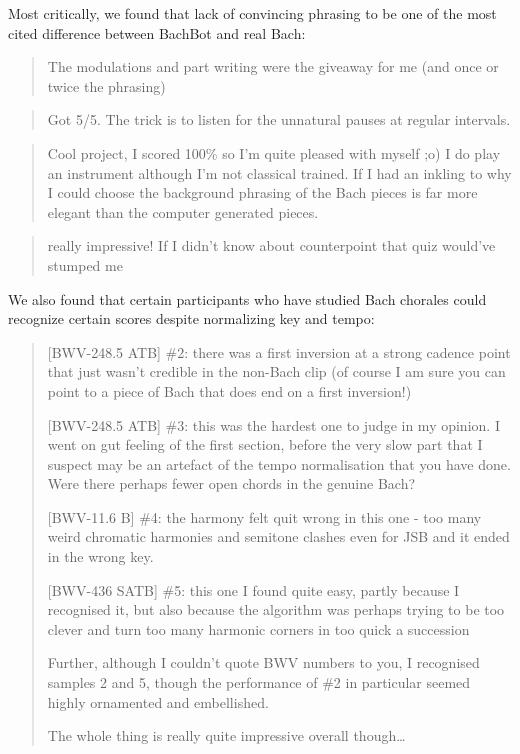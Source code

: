 Most critically, we found that lack of convincing phrasing to be one of the most
cited difference between BachBot and real Bach:
\begin{quote}
  The modulations and part writing were the giveaway for me (and once or twice the phrasing)
\end{quote}

\begin{quote}
  Got 5/5. The trick is to listen for the unnatural pauses at regular intervals.
\end{quote}

\begin{quote}
  Cool project, I scored 100\% so I'm quite pleased with myself ;o) I do
  play an instrument although I'm not classical trained. If I had an
  inkling to why I could choose the background phrasing of the Bach
  pieces is far more elegant than the computer generated pieces.
\end{quote}


\begin{quote}
  really impressive! If I didn't know about counterpoint that quiz would've stumped me
\end{quote}

We also found that certain participants who have studied Bach chorales could recognize
certain scores despite normalizing key and tempo:
\begin{quote}
  [BWV-248.5 ATB]
  \#2: there was a first inversion at a strong cadence point that just wasn't
  credible in the non-Bach clip (of course I am sure you can point to a piece
  of Bach that does end on a first inversion!)

  [BWV-248.5 ATB]
  \#3: this was the hardest one to judge in my opinion. I went on gut feeling
  of the first section, before the very slow part that I suspect may be an
  artefact of the tempo normalisation that you have done. Were there perhaps
  fewer open chords in the genuine Bach?

  [BWV-11.6 B]
  \#4: the harmony felt quit wrong in this one - too many weird chromatic
  harmonies and semitone clashes even for JSB and it ended in the wrong key.

  [BWV-436 SATB]
  \#5: this one I found quite easy, partly because I recognised it, but also
  because the algorithm was perhaps trying to be too clever and turn too many
  harmonic corners in too quick a succession

  Further, although I couldn't quote BWV numbers to you, I recognised samples 2
  and 5, though the performance of \#2 in particular seemed highly ornamented
  and embellished.

  The whole thing is really quite impressive overall though\ldots
\end{quote}

